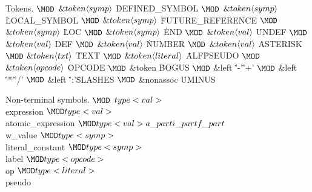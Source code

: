 Tokens.
\Y\B$\MOD$ $\&{token}\langle\\{symp}\rangle{}$ \.{DEFINED\_SYMBOL}\6
$\MOD$ $\&{token}\langle\\{symp}\rangle{}$ \.{LOCAL\_SYMBOL}\6
$\MOD$ $\&{token}\langle\\{symp}\rangle{}$ \.{FUTURE\_REFERENCE}\6
$\MOD$ $\&{token}\langle\\{symp}\rangle{}$ \.{LOC}\6
$\MOD$ $\&{token}\langle\\{symp}\rangle{}$ \.{END}\6
$\MOD$ $\&{token}\langle\\{val}\rangle{}$ \.{UNDEF}\6
$\MOD$ $\&{token}\langle\\{val}\rangle{}$ \.{DEF}\6
$\MOD$ $\&{token}\langle\\{val}\rangle{}$ \.{NUMBER}\6
$\MOD$ $\&{token}\langle\\{val}\rangle{}$ \.{ASTERISK}\6
$\MOD$ $\&{token}\langle\\{txt}\rangle{}$ \.{TEXT}\6
$\MOD$ $\&{token}\langle\\{literal}\rangle{}$ \.{ALF}\.{PSEUDO}\6
$\MOD$ $\&{token}\langle\\{opcode}\rangle{}$ \.{OPCODE}\6
$\MOD$ \&{token} \.{BOGUS}\6
$\MOD$ \&{left} \.{'-'}\.{'+'}\6
$\MOD$ \&{left} \.{'*'}\.{'/'}\6
$\MOD$ \&{left} \.{':'}\.{SLASHES}\6
$\MOD$ \&{nonassoc} \.{UMINUS}\par
\fi

Non-terminal symbols.
\Y\B$\MOD$ $\\{type}<\\{val}>{}$\\{expression}\6
${}\MOD\\{type}<\\{val}>{}$\\{atomic\_expression}\6
${}\MOD\\{type}<\\{val}>\\{a\_part}\\{i\_part}\\{f\_part}{}$\\{w\_value}\6
${}\MOD\\{type}<\\{symp}>{}$\\{literal\_constant}\6
${}\MOD\\{type}<\\{symp}>{}$\\{label}\6
${}\MOD\\{type}<\\{opcode}>{}$\\{op}\6
${}\MOD\\{type}<\\{literal}>{}$\\{pseudo}\6
\vb{\%\%}\par
\fi

